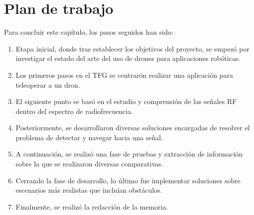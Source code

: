 \section{Plan de trabajo}
\label{sec:plantrabajo}

Para concluir este capítulo, los pasos seguidos han sido:

\begin{enumerate}
	\item Etapa inicial, donde tras establecer los objetivos del proyecto, se empezó por investigar el estado del arte del uso de drones para aplicaciones robóticas.
	\item Los primeros pasos en el \ac{TFG} se centrarón realizar una aplicación para teleoperar a un dron.
	\item El siguiente punto se basó en el estudio y comprensión de las señales \ac{RF} dentro del espectro de radiofrecuencia.
	\item Posteriormente, se desarrollaron diversas soluciones encargadas de resolver el problema de detectar y navegar hacia una señal.
	\item A continuación, se realizó una fase de pruebas y extracción de información sobre la que se realizaron diversas comparativas.
	\item Cerrando la fase de desarrollo, lo último fue implementar soluciones sobre escenarios más realistas que incluían obstáculos.
	\item Finalmente, se realizó la redacción de la memoria.
\end{enumerate}